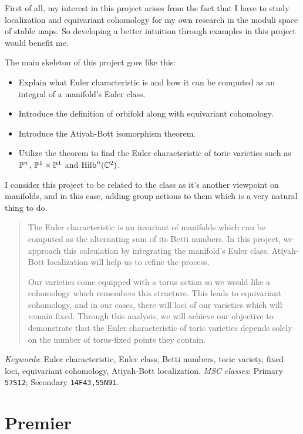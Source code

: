\documentclass[12pt]{memoir}
\begin{document}
    First of all, my interest in this project arises from the fact that I have to study localization and equivariant cohomology for my own research in the moduli space of stable maps. So developing a better intuition through examples in this project would benefit me.\par
    The main skeleton of this project goes like this:
    \begin{itemize}
        \item Explain what Euler characteristic is and how it can be computed as an integral of a manifold's Euler class.
        \item Introduce the definition of orbifold along with equivariant cohomology.
        \item Introduce the Atiyah-Bott isomorphism theorem. 
        \item Utilize the theorem to find the Euler characteristic of toric varieties such as $\mathbb{P}^n$, $\mathbb{P}^1\times\mathbb{P}^1$ and $\operatorname{Hilb}^n(\mathbb{C}^2)$.
    \end{itemize}
    I consider this project to be related to the class as it's another viewpoint on manifolds, and in this case, adding group actions to them which is a very natural thing to do. %
\fi
\begin{abstract}
    The Euler characteristic is an invariant of manifolds which can be computed as the alternating sum of its Betti numbers. In this project, we approach this calculation by integrating the manifold's Euler class. Atiyah-Bott localization will help us to refine the process.\par
    Our varieties come equipped with a torus action so we would like a cohomology which remembers this structure. This leads to equivariant cohomology, and in our cases, there will loci of our varieties which will remain fixed. Through this analysis, we will achieve our objective to demonstrate that the Euler characteristic of toric varieties depends solely on the number of torus-fixed points they contain.
    \end{abstract}
    \smallskip
    \begin{flushleft}
        \small
        \emph{Keywords}: Euler characteristic, Euler class, Betti numbers, toric variety, fixed loci, equivariant cohomology, Atiyah-Bott localization.
       \emph{MSC classes}:  Primary \texttt{57S12}; Secondary \texttt{14F43,55N91}.
    \end{flushleft}
    \section{Premier}
    
\end{document}
